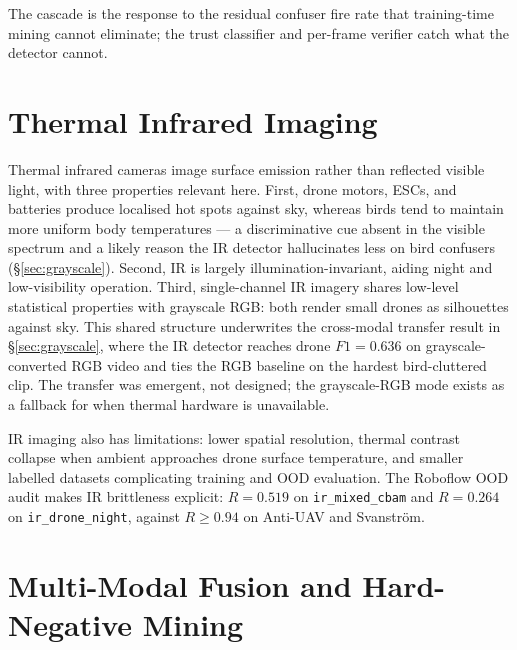 The cascade is the response to the residual confuser fire rate that training-time mining cannot eliminate; the trust classifier and per-frame verifier catch what the detector cannot.

\section{Thermal Infrared Imaging}
\label{sec:lit_ir}

Thermal infrared cameras image surface emission rather than reflected visible light, with three properties relevant here. First, drone motors, ESCs, and batteries produce localised hot spots against sky, whereas birds tend to maintain more uniform body temperatures --- a discriminative cue absent in the visible spectrum and a likely reason the IR detector hallucinates less on bird confusers (\S\ref{sec:grayscale}). Second, IR is largely illumination-invariant, aiding night and low-visibility operation. Third, single-channel IR imagery shares low-level statistical properties with grayscale RGB: both render small drones as silhouettes against sky. This shared structure underwrites the cross-modal transfer result in \S\ref{sec:grayscale}, where the IR detector reaches drone $F1=0.636$ on grayscale-converted RGB video and ties the RGB baseline on the hardest bird-cluttered clip. The transfer was emergent, not designed; the grayscale-RGB mode exists as a fallback for when thermal hardware is unavailable.

IR imaging also has limitations: lower spatial resolution, thermal contrast collapse when ambient approaches drone surface temperature, and smaller labelled datasets complicating training and OOD evaluation. The Roboflow OOD audit makes IR brittleness explicit: $R=0.519$ on \texttt{ir\_mixed\_cbam} and $R=0.264$ on \texttt{ir\_drone\_night}, against $R\geq 0.94$ on Anti-UAV and Svanstr\"om.

\section{Multi-Modal Fusion and Hard-Negative Mining}
\label{sec:lit_fusion}


